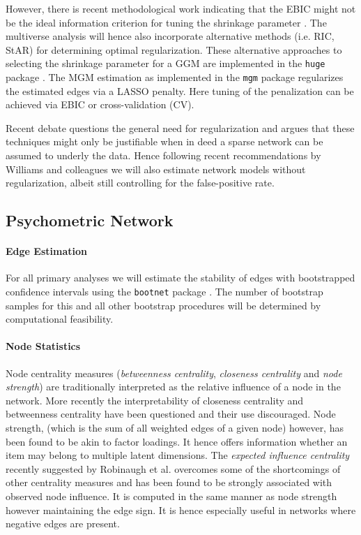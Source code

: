 \documentclass[a4paper,12pt]{article} %
\begin{document}
		However, there is recent methodological work indicating that the EBIC might not be the ideal information criterion for tuning the shrinkage parameter \parencite{wysocki_penalty_2019}.
		The multiverse analysis will hence also incorporate alternative methods (i.e. RIC, StAR) for determining optimal regularization.
		These alternative approaches to selecting the shrinkage parameter for a GGM are implemented in the \texttt{huge} package \parencite{huge}.
		The MGM estimation as implemented in the \texttt{mgm} package \parencite{mgm} regularizes the estimated edges via a LASSO penalty.
		Here tuning of the penalization can be achieved via EBIC or cross-validation (CV).

		Recent debate \parencite{williams_nonregularized_2019} questions the general need for regularization and argues that these techniques might only be justifiable when in deed a sparse network can be assumed to underly the data.
		Hence following recent recommendations by Williams and colleagues \parencite{williams_nonregularized_2019} we will also estimate network models without regularization, albeit still controlling for the false-positive rate.

		\subsection{Psychometric Network}

		\paragraph{Edge Estimation}
		For all primary analyses we will estimate the stability of edges with bootstrapped confidence intervals using the \texttt{bootnet} package \parencite{epskamp_estimating_2018}.
		The number of bootstrap samples for this and all other bootstrap procedures will be determined by computational feasibility.

		\paragraph{Node Statistics}
		Node centrality measures (\textit{betweenness centrality}, \textit{closeness centrality} and \textit{node strength}) are traditionally interpreted as the relative influence of a node in the network.
		More recently the interpretability of closeness centrality and betweenness centrality have been questioned and their use discouraged.
		Node strength, (which is the sum of all weighted edges of a given node) however, has been found to be akin to factor loadings.
		It hence offers information whether an item may belong to multiple latent dimensions.
		The \textit{expected influence centrality} recently suggested by Robinaugh et al. \parencite*{robinaugh_identifying_2016} overcomes some of the shortcomings of other centrality measures and has been found to be strongly associated with observed node influence. 
		It is computed in the same manner as node strength however maintaining the edge sign. It is hence especially useful in networks where negative edges are present.
\end{document}
